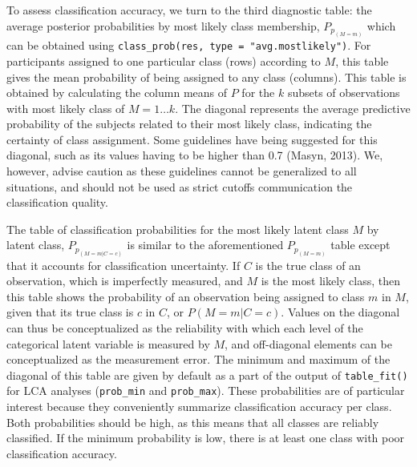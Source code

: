 \documentclass[
  ,man,floatsintext]{apa6}
\begin{document}
To assess classification accuracy, we turn to the third diagnostic table:
the average posterior probabilities by most likely class membership, \(P_{p_{(M = m)}}\)
which can be obtained using \texttt{class\_prob(res,\ type\ =\ "avg.mostlikely")}.
For participants assigned to one particular class (rows) according to \(M\),
this table gives the mean probability of being assigned to any class (columns).
This table is obtained by calculating the column means of \(P\) for the
\(k\) subsets of observations with most likely class of \(M = 1 \ldots k\).
The diagonal represents the average predictive probability of the subjects related
to their most likely class, indicating the certainty of class assignment.
Some guidelines have being suggested for this diagonal,
such as its values having to be higher than 0.7 (Masyn, 2013).
We, however, advise caution as these guidelines cannot be generalized to all situations,
and should not be used as strict cutoffs communication the classification quality.

The table of classification probabilities for the most likely latent class \(M\) by latent class,
\(P_{p_{(M = m | C = c)}}\) is similar to the aforementioned \(P_{p_{(M = m)}}\) table
except that it accounts for classification uncertainty.
If \(C\) is the true class of an observation, which is imperfectly measured,
and \(M\) is the most likely class,
then this table shows the probability of an observation being assigned to class \(m\) in \(M\), given that its true class is \(c\) in \(C\), or \(P(M=m|C=c)\).
Values on the diagonal can thus be conceptualized as the reliability with which each level of the categorical latent variable is measured by \(M\),
and off-diagonal elements can be conceptualized as the measurement error.
The minimum and maximum of the diagonal of this table are given by default as a part of the output of \texttt{table\_fit()} for LCA analyses (\texttt{prob\_min} and \texttt{prob\_max}).
These probabilities are of particular interest because they conveniently summarize classification accuracy per class.
Both probabilities should be high, as this means that all classes are reliably classified.
If the minimum probability is low,
there is at least one class with poor classification accuracy.
\end{document}
